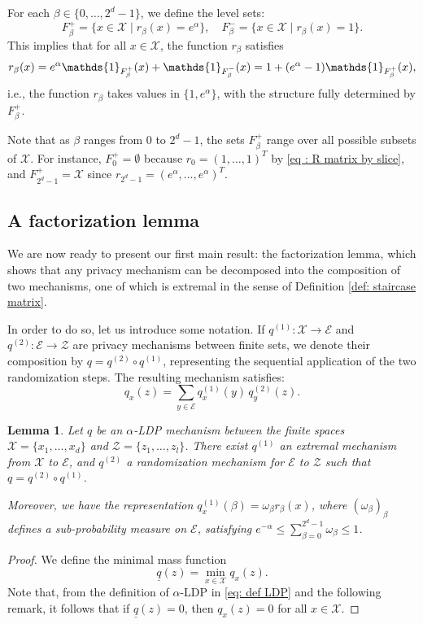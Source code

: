 \documentclass[a4paper, 11pt]{article}
\newtheorem{lemma}{Lemma}
\theoremstyle{definition}
\newcommand{\cE}{{\mathcal{E}}}
\newcommand{\cX}{{\mathcal{X}}}
\newcommand{\cY}{{\mathcal{Y}}}
\newcommand{\cZ}{{\mathcal{Z}}}
\newcommand{\indi}[1]{\mathds{1}_{#1}}
\begin{document}
{For each $\beta \in \{0, \dots, 2^d - 1\}$, we define the level sets:
\begin{equation}\label{eq: Fbeta+ 4.8}
F^+_\beta = \{ x \in \mathcal{X} \mid r_\beta(x) = e^\alpha \}, \quad
F^-_\beta = \{ x \in \mathcal{X} \mid r_\beta(x) = 1 \}.
\end{equation}
This implies that for all $x \in \mathcal{X}$, the function $r_\beta$ satisfies
\begin{equation}{\label{eq: r beta x}}
r_\beta(x) = e^\alpha \indi{F^+_\beta}(x) + \indi{F^-_\beta}(x) = 1 + (e^\alpha - 1) \indi{F^+_\beta}(x),
\end{equation}
i.e., the function $r_\beta$ takes values in $\{1, e^\alpha\}$, with the structure fully determined by $F^+_\beta$.

Note that as $\beta$ ranges from $0$ to $2^d - 1$, the sets $F^+_\beta$ range over all possible subsets of $\mathcal{X}$. For instance, $F^+_0 = \emptyset$ because $r_0 = (1, \dots, 1)^T$ by \eqref{eq : R matrix by slice}, and $F^+_{2^d - 1} = \mathcal{X}$ since $r_{2^d - 1} = (e^\alpha, \dots, e^\alpha)^T$.


\subsection{A factorization lemma}

We are now ready to present our first main result: the factorization lemma, which shows that any privacy mechanism can be decomposed into the composition of two mechanisms, one of which is extremal in the sense of Definition \ref{def: staircase matrix}.

In order to do so, let us introduce some notation. If $q^{(1)}: \mathcal{X} \to \mathcal{E}$ and $q^{(2)}: \mathcal{E} \to \mathcal{Z}$ are privacy mechanisms between finite sets, we denote their composition by $q = q^{(2)} \circ q^{(1)}$, representing the sequential application of the two randomization steps. The resulting mechanism satisfies:
$$
q_x(z) = \sum_{y \in \mathcal{E}} q^{(1)}_x(y) \, q^{(2)}_y(z).
$$
\begin{lemma}\label{lem : factorisation cas fini}
	Let $q$ be an $\alpha$-LDP mechanism between the finite spaces $\cX=\{x_1,\dots,x_d\}$ and $\cZ=\{z_1,\dots,z_l\}$. %
	There exist $q^{(1)}$ an extremal mechanism from $\cX$ to $\cE$, and $q^{(2)}$ a randomization mechanism for $\cE$ to $\cZ$ such that $q=q^{(2)}\circ q^{(1)}$.
	
	Moreover, we have the representation $q^{(1)}_x(\beta)= \omega_\beta r_\beta(x)$, where
	$(\omega_\beta)_\beta$ defines a sub-probability measure on $\cE$, satisfying $e^{-\alpha} \le \sum_{\beta=0}^{2^d-1} \omega_{\beta}\le 1$.
\end{lemma}
\begin{proof}
We define the minimal mass function
$$
\underline{q}(z) = \min_{x \in \cX} q_x(z).
$$
Note that, from the definition of $\alpha$-LDP in \eqref{eq: def LDP} and the following remark, it follows that if $\underline{q}(z) = 0$, then $q_x(z) = 0$ for all $x \in \cX$.


\end{proof}}
\end{document}
